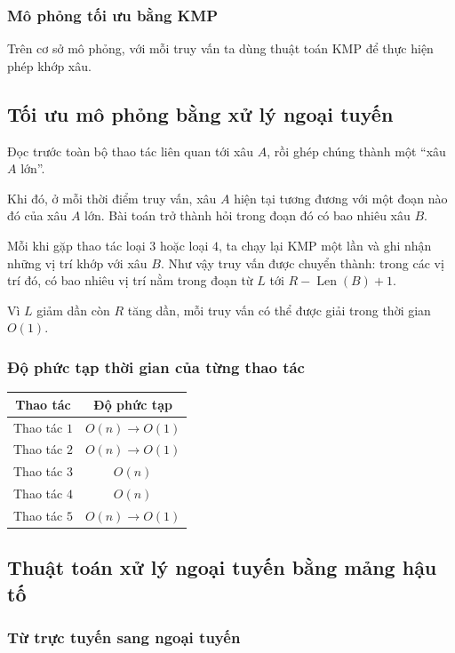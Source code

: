\documentclass[11pt]{article}
\begin{document}
\subsubsection{Mô phỏng tối ưu bằng KMP}

Trên cơ sở mô phỏng, với mỗi truy vấn ta dùng thuật toán KMP để thực hiện
phép khớp xâu.

\subsection{Tối ưu mô phỏng bằng xử lý ngoại tuyến}

Đọc trước toàn bộ thao tác liên quan tới xâu \(A\), rồi ghép chúng thành một
``xâu \(A\) lớn''.

Khi đó, ở mỗi thời điểm truy vấn, xâu \(A\) hiện tại tương đương với một đoạn
nào đó của xâu \(A\) lớn. Bài toán trở thành hỏi trong đoạn đó có bao nhiêu
xâu \(B\).

Mỗi khi gặp thao tác loại \(3\) hoặc loại \(4\), ta chạy lại KMP một lần và
ghi nhận những vị trí khớp với xâu \(B\). Như vậy truy vấn được chuyển thành:
trong các vị trí đó, có bao nhiêu vị trí nằm trong đoạn từ \(L\) tới
\(R-\operatorname{Len}(B)+1\).

Vì \(L\) giảm dần còn \(R\) tăng dần, mỗi truy vấn có thể được giải trong
thời gian \(O(1)\).

\subsubsection{Độ phức tạp thời gian của từng thao tác}

\begin{center}
\begin{tabular}{c c}
\textbf{Thao tác} & \textbf{Độ phức tạp} \\
\hline
Thao tác \(1\) & \(O(n)\to O(1)\) \\
Thao tác \(2\) & \(O(n)\to O(1)\) \\
Thao tác \(3\) & \(O(n)\) \\
Thao tác \(4\) & \(O(n)\) \\
Thao tác \(5\) & \(O(n)\to O(1)\)
\end{tabular}
\end{center}

\subsection{Thuật toán xử lý ngoại tuyến bằng mảng hậu tố}

\subsubsection{Từ trực tuyến sang ngoại tuyến}
\end{document}
